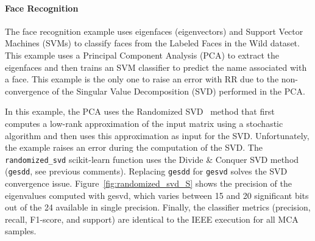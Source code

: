 \documentclass[11pt]{article}
\begin{document}






\paragraph{Face Recognition}

The face recognition example uses eigenfaces (eigenvectors) and Support Vector Machines (SVMs) to classify faces from the Labeled Faces in the Wild dataset. This example uses a Principal Component Analysis (PCA) to extract the eigenfaces and then trains an SVM classifier to predict the name associated with a face. This example is the only one to raise an error with RR due to the non-convergence of the Singular Value Decomposition (SVD) performed in the PCA.

In this example, the PCA uses the Randomized SVD~\cite{halko2011finding} method that first computes a low-rank approximation of the input matrix using a stochastic algorithm and then uses this approximation as input for the SVD. Unfortunately, the example raises an error during the computation of the SVD.
The \texttt{randomized\_svd} scikit-learn function uses the Divide \& Conquer SVD method (\texttt{gesdd}, see previous comments). 
Replacing \texttt{gesdd} for \texttt{gesvd} solves the SVD convergence issue. Figure~\ref{fig:randomized_svd_S} shows the precision of the eigenvalues computed with gesvd, which varies between 15 and 20 significant bits out of the 24 available in single precision. Finally, the classifier metrics (precision, recall, F1-score, and support) are identical to the IEEE execution for all MCA samples.
\end{document}
